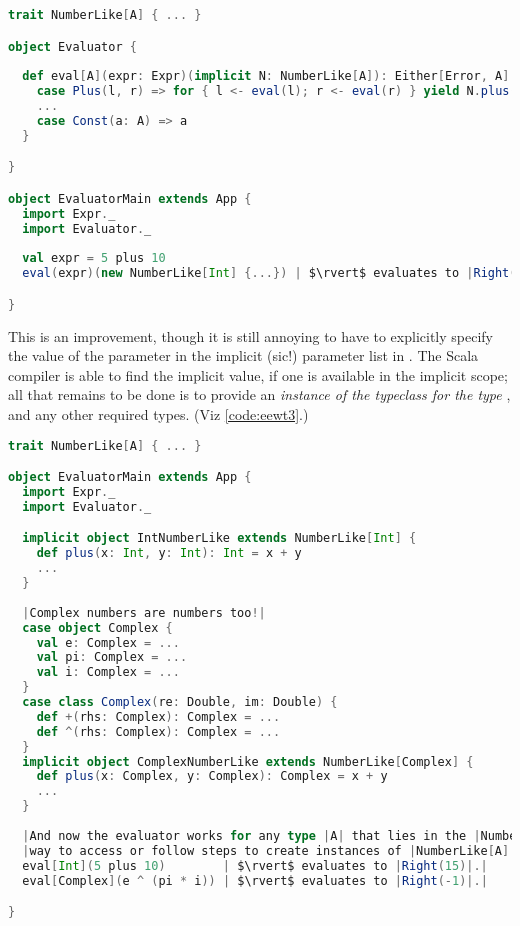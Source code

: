 \documentclass[10 pt]{article}
\begin{document}
\begin{lstlisting}[caption={Expression evaluator with typeclasses-ish}, label={code:eewt2}, language=Scala, escapechar=|]
trait NumberLike[A] { ... }

object Evaluator {
 
  def eval[A](expr: Expr)(implicit N: NumberLike[A]): Either[Error, A] = expr match {
    case Plus(l, r) => for { l <- eval(l); r <- eval(r) } yield N.plus(l, r)
    ...
    case Const(a: A) => a
  }

}

object EvaluatorMain extends App {
  import Expr._
  import Evaluator._
  
  val expr = 5 plus 10
  eval(expr)(new NumberLike[Int] {...}) | $\rvert$ evaluates to |Right(15)|.|

}
\end{lstlisting}

This is an improvement, though it is still annoying to have to explicitly specify the value of the  parameter in the implicit (sic!) parameter list in . The Scala compiler is able to find the implicit value, if one is available in the implicit scope; all that remains to be done is to provide an \emph{instance of the  typeclass for the type }, and any other required types. (Viz \autoref{code:eewt3}.)

\begin{lstlisting}[caption={Expression evaluator with typeclasses}, label={code:eewt3}, language=Scala, escapechar=|]
trait NumberLike[A] { ... }

object EvaluatorMain extends App {
  import Expr._
  import Evaluator._

  implicit object IntNumberLike extends NumberLike[Int] {
    def plus(x: Int, y: Int): Int = x + y
    ...
  }
  
  |Complex numbers are numbers too!|
  case object Complex {
    val e: Complex = ...
    val pi: Complex = ...
    val i: Complex = ...
  }
  case class Complex(re: Double, im: Double) {
    def +(rhs: Complex): Complex = ...
    def ^(rhs: Complex): Complex = ...
  }
  implicit object ComplexNumberLike extends NumberLike[Complex] {
    def plus(x: Complex, y: Complex): Complex = x + y
    ...
  }
  
  |And now the evaluator works for any type |A| that lies in the |NumberLike| typeclass; i.e. where there is an in-scope|
  |way to access or follow steps to create instances of |NumberLike[A]|.|
  eval[Int](5 plus 10)        | $\rvert$ evaluates to |Right(15)|.|
  eval[Complex](e ^ (pi * i)) | $\rvert$ evaluates to |Right(-1)|.|

}
\end{lstlisting}
\end{document}
